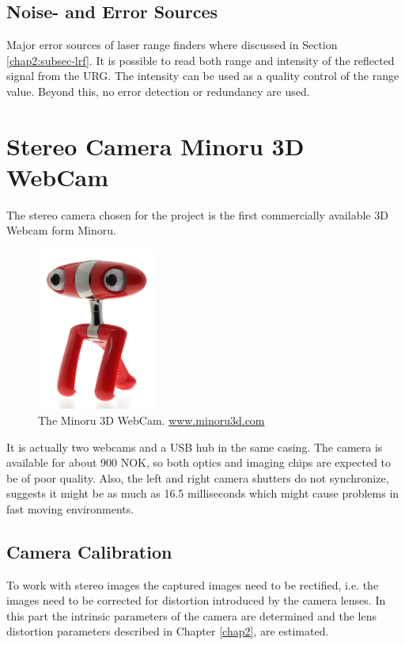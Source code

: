 \subsection{Noise- and Error Sources}
Major error sources of laser range finders where discussed in Section \ref{chap2:subsec-lrf}. It is
possible to read both range and intensity of the reflected signal from the URG. The
intensity can be used as a quality control of the range value. Beyond this, no error
detection or redundancy are used. 



\section{Stereo Camera Minoru 3D WebCam}
The stereo camera chosen for the project is the first commercially available 3D Webcam
form Minoru.
\begin{figure}[htbp]
    \centering
    \includegraphics[width=0.35\textwidth]{pics/minoru3d}
    \caption[The Minoru 3D WebCam.]{The Minoru 3D WebCam. \url{www.minoru3d.com}}
    \label{chap3:fig-minoru}
\end{figure}
It is actually two webcams and a USB hub in the same casing. The camera is
available for about 900 NOK, so both optics and imaging chips are expected to be of poor
quality. Also, the left and right camera shutters do not synchronize, \cite{nma-web}
suggests it might be as much as 16.5 milliseconds which might cause problems in fast
moving environments. 


\subsection{Camera Calibration}
To work with stereo images the captured images need to be rectified, i.e. the images need
to be corrected for distortion introduced by the camera lenses. In this part 
the intrinsic parameters of the camera are determined and the lens distortion parameters 
described in Chapter \ref{chap2}, are estimated. 

